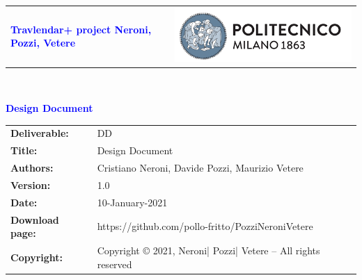 




\begin{titlepage}



{\begin{table}[t!]
\centering
\begin{tabu} to \textwidth { X[1.3,r,p] X[1.7,l,p] }
\textcolor{Blue}
{\textbf{\small{Travlendar+ project Neroni, Pozzi, Vetere}}} & \includegraphics[scale=0.5]{Images/PolimiLogo}
\end{tabu}
\end{table}}~\\ [7cm]


\begin{flushleft}

{\textcolor{Blue}{\textbf{\Huge{Design
        Document}}}} \\ [1cm]

\end{flushleft}

\end{titlepage}

\begin{table}[h!]
\begin{tabu} to \textwidth { X[0.3,r,p] X[0.7,l,p] }
\hline

\textbf{Deliverable:} & DD\\
\textbf{Title:} & Design Document \\
\textbf{Authors:} & Cristiano Neroni, Davide Pozzi, Maurizio Vetere \\
\textbf{Version:} & 1.0 \\ 
\textbf{Date:} & 10-January-2021 \\
\textbf{Download page:} & https://github.com/pollo-fritto/PozziNeroniVetere \\
\textbf{Copyright:} & Copyright © 2021, Neroni| Pozzi| Vetere – All rights reserved \\
\hline
\end{tabu}
\end{table}




